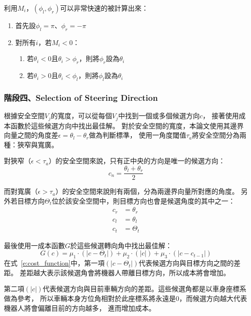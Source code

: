 利用$M_i$，$(\phi_l,\phi_r)$可以非常快速的被計算出來：
\begin{enumerate}
	\item{首先設$\phi_l = \pi$、$\phi_r = -\pi$}
	\item{對所有$i$，若$M_i < 0$：}
		\begin{enumerate}
			\item{若$\theta_i < 0$且$\theta_i > \phi_r$，則將$\phi_r$設為$\theta_i$}
			\item{若$\theta_i > 0$且$\theta_i < \phi_l$，則將$\phi_l$設為$\theta_i$}
		\end{enumerate}
\end{enumerate}

\subsubsection{階段四、Selection of Steering Direction}
根據安全空間$V_j$的寬度，可以從每個$V_j$中找到一個或多個候選方向$c$，
接著使用成本函數於這些候選方向中找出最佳解。
對於安全空間的寬度，本論文使用其邊界向量之間的角度差$\epsilon = \theta_l - \theta_r$做為判斷標準，
使用一角度閾值$\tau_a$將安全空間分為兩種：狹窄與寬廣。

對狹窄（$\epsilon < \tau_a$）的安全空間來說，只有正中央的方向是唯一的候選方向：
\begin{equation}
	c_n = \frac{\theta_l + \theta_r}{2}
\end{equation}

而對寬廣（$\epsilon > \tau_a$）的安全空間來說則有兩個，分為兩邊界向量所對應的角度。
另外若目標方向$\Theta_t$位於該安全空間中，則目標方向也會是候選角度的其中之一：
\begin{align}
	c_r &= \theta_r \nonumber \\
	c_l &= \theta_l \nonumber \\
	c_t &= \Theta_t 
\end{align}

最後使用一成本函數$G$於這些候選轉向角中找出最佳解：
\begin{equation}
	G(c) = \mu_1\cdot(|c - \Theta_t|) + \mu_2\cdot(|c|) + \mu_3\cdot(|c - c_{t-1}|)
	\label{e:cost_function}
\end{equation}
在式~\ref{e:cost_function}中，第一項$(|c - \Theta_t|)$代表候選方向與目標方向之間的差距。
差距越大表示該候選角會將機器人帶離目標方向，所以成本將會增加。

第二項$(|c|)$代表候選方向與目前車輛方向的差距。這些候選角都是以車身座標系做為參考，
所以車輛本身方位角相對於此座標系將永遠是$0$，而候選方向越大代表機器人將會偏離目前的方向越多，
進而增加成本。

